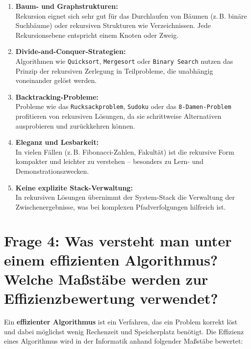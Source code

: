 \documentclass{article}
\begin{document}
\begin{enumerate}
	\item \textbf{Baum- und Graphstrukturen:} \\
	Rekursion eignet sich sehr gut für das Durchlaufen von Bäumen (z.\,B. binäre Suchbäume) oder rekursiven Strukturen wie Verzeichnissen. Jede Rekursionsebene entspricht einem Knoten oder Zweig.
	
	\item \textbf{Divide-and-Conquer-Strategien:} \\
	Algorithmen wie \texttt{Quicksort}, \texttt{Mergesort} oder \texttt{Binary Search} nutzen das Prinzip der rekursiven Zerlegung in Teilprobleme, die unabhängig voneinander gelöst werden.
	
	\item \textbf{Backtracking-Probleme:} \\
	Probleme wie das \texttt{Rucksackproblem}, \texttt{Sudoku} oder das \texttt{8-Damen-Problem} profitieren von rekursiven Lösungen, da sie schrittweise Alternativen ausprobieren und zurückkehren können.
	
	\item \textbf{Eleganz und Lesbarkeit:} \\
	In vielen Fällen (z.\,B. Fibonacci-Zahlen, Fakultät) ist die rekursive Form kompakter und leichter zu verstehen – besonders zu Lern- und Demonstrationszwecken.
	
	\item \textbf{Keine explizite Stack-Verwaltung:} \\
	In rekursiven Lösungen übernimmt der System-Stack die Verwaltung der Zwischenergebnisse, was bei komplexen Pfadverfolgungen hilfreich ist.
\end{enumerate}

\section*{Frage 4: Was versteht man unter einem effizienten Algorithmus? Welche Maßstäbe werden zur Effizienzbewertung verwendet?}

Ein \textbf{effizienter Algorithmus} ist ein Verfahren, das ein Problem korrekt löst und dabei möglichst wenig Rechenzeit und Speicherplatz benötigt. Die Effizienz eines Algorithmus wird in der Informatik anhand folgender Maßstäbe bewertet:
\end{document}
